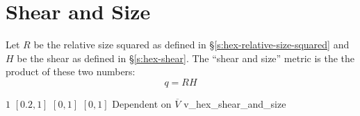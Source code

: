 \section{Shear and Size\label{s:hex-shear-and-size}}

Let $R$ be the relative size squared as defined in \S\ref{s:hex-relative-size-squared}
and $H$ be the shear as defined in \S\ref{s:hex-shear}.
The ``shear and size'' metric is the the product of these two numbers:
\[
  q = RH
\]

%
{$1$}%
{$[0.2,1]$}%
{$[0,1]$}%
{$[0,1]$}%
{Dependent on $\overline{V}$}%
{\cite{knu:03}}%
{v\_hex\_shear\_and\_size}%
